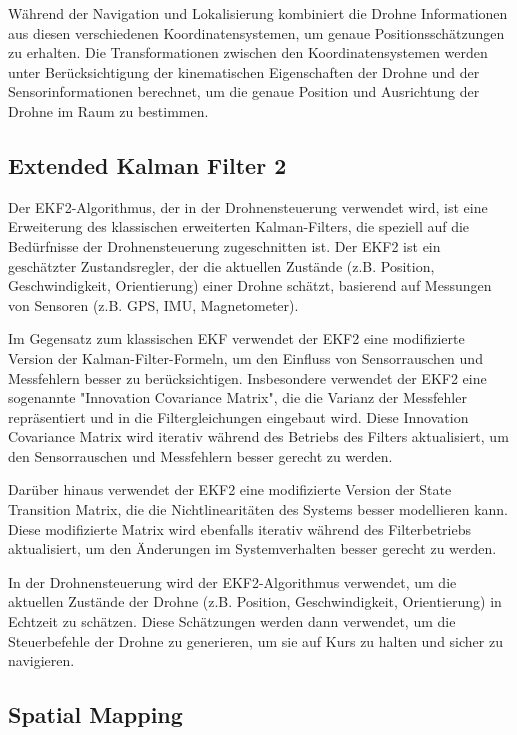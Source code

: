 Während der Navigation und Lokalisierung kombiniert die Drohne Informationen aus diesen verschiedenen Koordinatensystemen, um genaue Positionsschätzungen zu erhalten. Die Transformationen zwischen den Koordinatensystemen werden unter Berücksichtigung der kinematischen Eigenschaften der Drohne und der Sensorinformationen berechnet, um die genaue Position und Ausrichtung der Drohne im Raum zu bestimmen.


    \cite[vgl. ]{SWB-1841134112}

 \subsection{Extended Kalman Filter 2}
    Der \ac{EKF}2-Algorithmus, der in der Drohnensteuerung verwendet wird, ist eine Erweiterung des klassischen erweiterten Kalman-Filters, die speziell auf die Bedürfnisse der Drohnensteuerung zugeschnitten ist. Der EKF2 ist ein geschätzter Zustandsregler, der die aktuellen Zustände (z.B. Position, Geschwindigkeit, Orientierung) einer Drohne schätzt, basierend auf Messungen von Sensoren (z.B. \ac{GPS}, \ac{IMU}, Magnetometer).

Im Gegensatz zum klassischen EKF verwendet der EKF2 eine modifizierte Version der Kalman-Filter-Formeln, um den Einfluss von Sensorrauschen und Messfehlern besser zu berücksichtigen. Insbesondere verwendet der EKF2 eine sogenannte "Innovation Covariance Matrix", die die Varianz der Messfehler repräsentiert und in die Filtergleichungen eingebaut wird. Diese Innovation Covariance Matrix wird iterativ während des Betriebs des Filters aktualisiert, um den Sensorrauschen und Messfehlern besser gerecht zu werden.

Darüber hinaus verwendet der EKF2 eine modifizierte Version der State Transition Matrix, die die Nichtlinearitäten des Systems besser modellieren kann. Diese modifizierte Matrix wird ebenfalls iterativ während des Filterbetriebs aktualisiert, um den Änderungen im Systemverhalten besser gerecht zu werden.

In der Drohnensteuerung wird der EKF2-Algorithmus verwendet, um die aktuellen Zustände der Drohne (z.B. Position, Geschwindigkeit, Orientierung) in Echtzeit zu schätzen. Diese Schätzungen werden dann verwendet, um die Steuerbefehle der Drohne zu generieren, um sie auf Kurs zu halten und sicher zu navigieren.
    
    \subsection{Spatial Mapping} \label{spatial_mapping:subsection}


